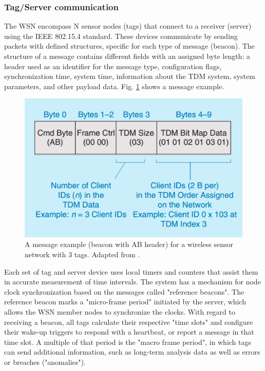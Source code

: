 \documentclass[journal]{IEEEtran}	%
\begin{document}
\subsubsection{Tag/Server communication}
\label{sub:tag_server}


The WSN encompass N sensor nodes (tags) that connect to a receiver (server) using the IEEE 802.15.4 standard. These devices communicate by sending packets with defined structures, specific for each type of message (beacon). The structure of a message contains different fields with an assigned byte length: a header used as an identifier for the message type, configuration flags, synchronization time, system time, information about the TDM system, system parameters, and other payload data. Fig. \ref{fig:beacon_example} shows a message example.

\begin{figure}[t!]
\centering
\includegraphics[width=0.9\columnwidth]{fig10.png}
\caption{A message example (beacon with AB header) for a wireless sensor network with 3 tags. Adapted from \cite{williams2017weaving}.}
\label{fig:beacon_example}
\end{figure}

Each set of tag and server device uses local timers and counters that assist them in accurate measurement of time intervals. The system has a mechanism for node clock synchronization based on the messages called "reference beacons". The reference beacon marks a "micro-frame period" initiated by the server, which allows the WSN member nodes to synchronize the clocks. With regard to receiving a beacon, all tags calculate their respective "time slots" and configure their wake-up triggers to respond with a heartbeat, or report a message in that time slot. A multiple of that period is the "macro frame period", in which tags can send additional information, such as long-term analysis data as well as errors or breaches ("anomalies").
\end{document}
